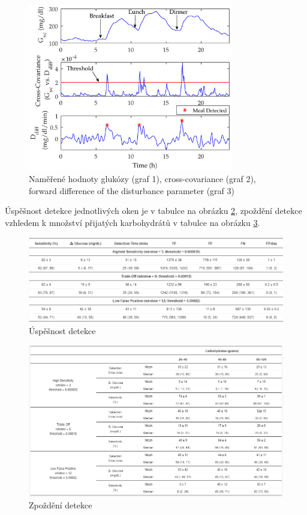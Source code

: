 \begin{figure}[H]
\caption{Naměřené hodnoty glukózy (graf 1), cross-covariance (graf 2), forward difference of the disturbance parameter (graf 3)}
\label{fig:crosscovariance1}
\centering
\includegraphics[width=0.8\textwidth]{img/analyza/crosscovariance1.jpg}
\end{figure}

Úspěšnost detekce jednotlivých oken je v tabulce na obrázku \ref{fig:crosscovariance2}, zpoždění detekce vzhledem k množství přijatých karbohydrátů v tabulce na obrázku \ref{fig:crosscovariance3}.

\begin{figure}[H]
\caption{Úspěšnost detekce}
\label{fig:crosscovariance2}
\includegraphics[width=1\textwidth]{img/analyza/crosscovariance2.png}
\end{figure}

\begin{figure}[H]
\caption{Zpoždění detekce}
\label{fig:crosscovariance3}
\includegraphics[width=1\textwidth]{img/analyza/crosscovariance3.png}
\end{figure}



